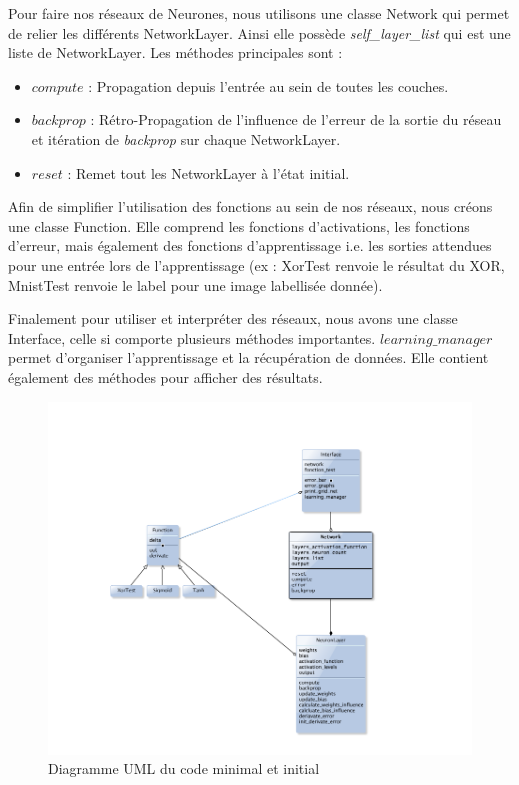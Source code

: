 Pour faire nos réseaux de Neurones, nous utilisons une classe Network qui permet de relier les différents NetworkLayer. Ainsi elle possède \emph{self\_layer\_list} qui est une liste de NetworkLayer. Les méthodes principales sont :  
 \begin{itemize}
  \item $compute$ : Propagation depuis l'entrée au sein de toutes les couches.
  \item $backprop$ : Rétro-Propagation de l'influence de l'erreur de la sortie du réseau et itération de \emph{backprop} sur chaque NetworkLayer.
  \item $reset$ : Remet tout les NetworkLayer à l'état initial.
 \end{itemize}

Afin de simplifier l'utilisation des fonctions au sein de nos réseaux, nous créons une classe Function. Elle comprend les fonctions d'activations, les fonctions d'erreur, mais également des fonctions d'apprentissage i.e. les sorties attendues pour une entrée lors de l'apprentissage (ex : XorTest renvoie le résultat du XOR, MnistTest renvoie le label pour une image labellisée donnée).

Finalement pour utiliser et interpréter des réseaux, nous avons une classe Interface, celle si comporte plusieurs méthodes importantes. $learning\_manager$ permet d'organiser l'apprentissage et la récupération de données. Elle contient également des méthodes pour afficher des résultats.


\begin{figure}[ht!]
  \includegraphics[width=\linewidth]{fig/uml_xor}
  \caption{Diagramme UML du code minimal et initial}
  \label{fig:uml_xor}
\end{figure}

